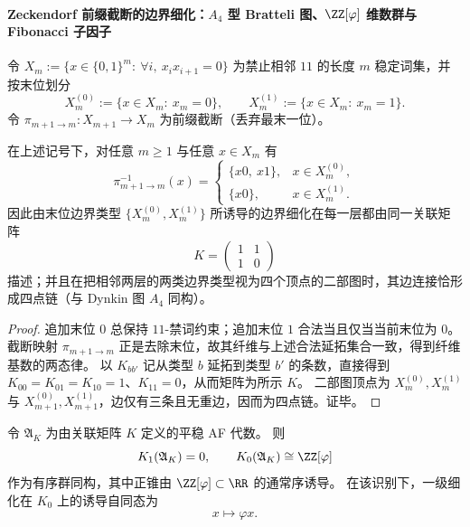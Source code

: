 \paragraph{Zeckendorf 前缀截断的边界细化：\texorpdfstring{$A_4$}{A4} 型 Bratteli 图、\texorpdfstring{$\ZZ[\varphi]$}{Z[phi]} 维数群与 Fibonacci 子因子}
令 \(X_m:=\{x\in\{0,1\}^m:\ \forall i,\ x_ix_{i+1}=0\}\) 为禁止相邻 \(11\) 的长度 \(m\) 稳定词集，并按末位划分
\[
X_m^{(0)}:=\{x\in X_m:\ x_m=0\},
\qquad
X_m^{(1)}:=\{x\in X_m:\ x_m=1\}.
\]
令 \(\pi_{m+1\to m}:X_{m+1}\to X_m\) 为前缀截断（丢弃最末一位）。

\begin{theorem}\label{thm:xi-zeckendorf-boundary-refinement-a4-bratteli}
在上述记号下，对任意 \(m\ge 1\) 与任意 \(x\in X_m\) 有
\[
\pi_{m+1\to m}^{-1}(x)=
\begin{cases}
\{x0,\ x1\}, & x\in X_m^{(0)},\\
\{x0\}, & x\in X_m^{(1)}.
\end{cases}
\]
因此由末位边界类型 \(\{X_m^{(0)},X_m^{(1)}\}\) 所诱导的边界细化在每一层都由同一关联矩阵
\[
K=\begin{pmatrix}1&1\\[2pt]1&0\end{pmatrix}
\]
描述；并且在把相邻两层的两类边界类型视为四个顶点的二部图时，其边连接恰形成四点链（与 Dynkin 图 \(A_4\) 同构）。
\end{theorem}

\begin{proof}
追加末位 \(0\) 总保持 \(11\)-禁词约束；追加末位 \(1\) 合法当且仅当当前末位为 \(0\)。
截断映射 \(\pi_{m+1\to m}\) 正是去除末位，故其纤维与上述合法延拓集合一致，得到纤维基数的两态律。
以 \(K_{bb'}\) 记从类型 \(b\) 延拓到类型 \(b'\) 的条数，直接得到 \(K_{00}=K_{01}=K_{10}=1\)、\(K_{11}=0\)，从而矩阵为所示 \(K\)。
二部图顶点为 \(X_m^{(0)},X_m^{(1)}\) 与 \(X_{m+1}^{(0)},X_{m+1}^{(1)}\)，边仅有三条且无重边，因而为四点链。证毕。
\end{proof}

\begin{theorem}\label{thm:xi-zeckendorf-a4-af-k0-zphi}
令 \(\mathfrak{A}_K\) 为由关联矩阵 \(K\) 定义的平稳 AF 代数。
则
\[
K_1(\mathfrak{A}_K)=0,
\qquad
K_0(\mathfrak{A}_K)\cong \ZZ[\varphi]
\]
作为有序群同构，其中正锥由 \(\ZZ[\varphi]\subset\RR\) 的通常序诱导。
在该识别下，一级细化在 \(K_0\) 上的诱导自同态为
\[
x\longmapsto \varphi x.
\]
\end{theorem}

